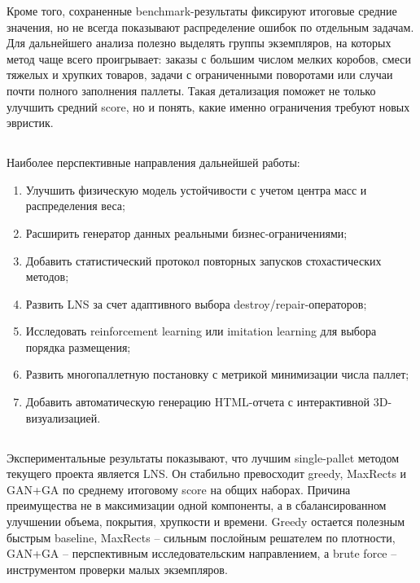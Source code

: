 Кроме того, сохраненные benchmark-результаты фиксируют итоговые средние значения, но не всегда показывают распределение ошибок по отдельным задачам. Для дальнейшего анализа полезно выделять группы экземпляров, на которых метод чаще всего проигрывает: заказы с большим числом мелких коробов, смеси тяжелых и хрупких товаров, задачи с ограниченными поворотами или случаи почти полного заполнения паллеты. Такая детализация поможет не только улучшить средний score, но и понять, какие именно ограничения требуют новых эвристик.

\subsection{}

Наиболее перспективные направления дальнейшей работы:
\begin{enumerate}
  \item Улучшить физическую модель устойчивости с учетом центра масс и распределения веса;
  \item Расширить генератор данных реальными бизнес-ограничениями;
  \item Добавить статистический протокол повторных запусков стохастических методов;
  \item Развить LNS за счет адаптивного выбора destroy/repair-операторов;
  \item Исследовать reinforcement learning или imitation learning для выбора порядка размещения;
  \item Развить многопаллетную постановку с метрикой минимизации числа паллет;
  \item Добавить автоматическую генерацию HTML-отчета с интерактивной 3D-визуализацией.
\end{enumerate}

\subsection{}

Экспериментальные результаты показывают, что лучшим single-pallet методом текущего проекта является LNS. Он стабильно превосходит greedy, MaxRects и GAN+GA по среднему итоговому score на общих наборах. Причина преимущества не в максимизации одной компоненты, а в сбалансированном улучшении объема, покрытия, хрупкости и времени. Greedy остается полезным быстрым baseline, MaxRects -- сильным послойным решателем по плотности, GAN+GA -- перспективным исследовательским направлением, а brute force -- инструментом проверки малых экземпляров.
